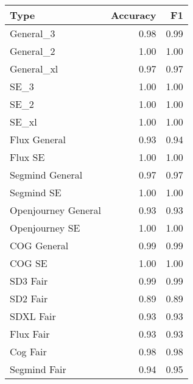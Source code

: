 \begin{tabular}{lrr}
\toprule
Type & Accuracy & F1 \\
\midrule
General_3 & 0.98 & 0.99 \\
General_2 & 1.00 & 1.00 \\
General_xl & 0.97 & 0.97 \\
SE_3 & 1.00 & 1.00 \\
SE_2 & 1.00 & 1.00 \\
SE_xl & 1.00 & 1.00 \\
Flux General & 0.93 & 0.94 \\
Flux SE & 1.00 & 1.00 \\
Segmind General & 0.97 & 0.97 \\
Segmind SE & 1.00 & 1.00 \\
Openjourney General & 0.93 & 0.93 \\
Openjourney SE & 1.00 & 1.00 \\
COG General & 0.99 & 0.99 \\
COG SE & 1.00 & 1.00 \\
SD3 Fair & 0.99 & 0.99 \\
SD2 Fair & 0.89 & 0.89 \\
SDXL Fair & 0.93 & 0.93 \\
Flux Fair & 0.93 & 0.93 \\
Cog Fair & 0.98 & 0.98 \\
Segmind Fair & 0.94 & 0.95 \\
\bottomrule
\end{tabular}
